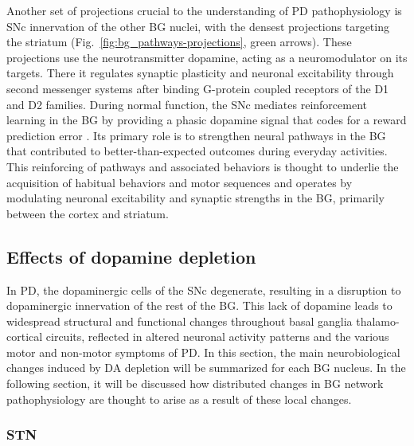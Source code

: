 Another set of projections crucial to the understanding of PD pathophysiology is
SNc innervation of the other BG nuclei, with the densest projections targeting
the striatum (Fig.~\ref{fig:bg_pathways-projections}, green arrows). These projections
use the neurotransmitter dopamine, acting as a neuromodulator on its targets. There it
regulates synaptic plasticity and neuronal excitability through second messenger systems
after binding G-protein coupled receptors of the D1 and D2 families.
%
%
%
%
%
%
During normal function, the SNc mediates reinforcement learning in the BG by
providing a phasic dopamine signal that codes for a reward prediction error
\cite{bayer_midbrain_2005}. Its primary role is to strengthen neural pathways
in the BG that contributed to better-than-expected outcomes during everyday activities.
This reinforcing of pathways and associated behaviors is thought to underlie
the acquisition of habitual behaviors and motor sequences and operates by modulating
neuronal excitability and synaptic strengths in the BG, primarily between the
cortex and striatum.


%
%
%
%
%
%
%
%
%

%
%
%
%
%

%
%
%
%

%
%
%
\subsection{Effects of dopamine depletion}
\label{sec:ch2-dd-effects}

%
%
%
%
%
%

%
%
%
%
%
%

%
%
%
%

%
%
%
%
%
%
%


In PD, the dopaminergic cells of the SNc degenerate, resulting in a disruption to
dopaminergic innervation of the rest of the BG. This lack of dopamine
leads to widespread structural and functional changes throughout basal ganglia
thalamo-cortical circuits, reflected in altered neuronal activity patterns and
the various motor and non-motor symptoms of PD. In this section, the main neurobiological
changes induced by DA depletion will be summarized for each BG nucleus. In the following
section, it will be discussed how distributed changes in BG network pathophysiology are thought
to arise as a result of these local changes.

%
%
%
\subsubsection*{STN}
\label{sec:ch2-dd-stn}

